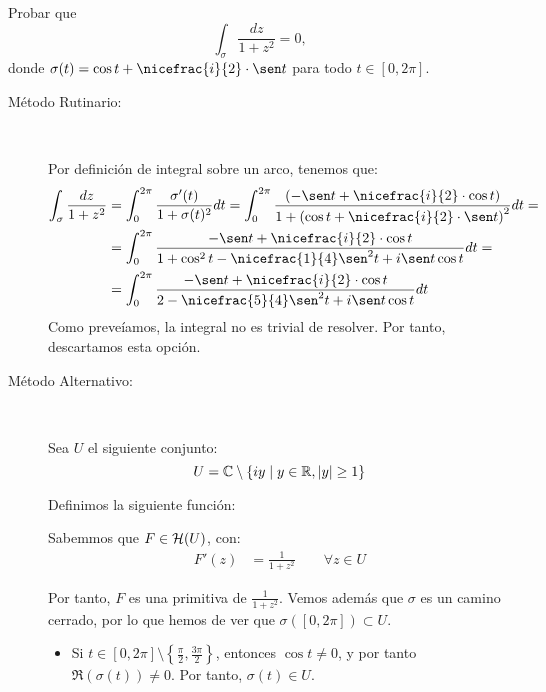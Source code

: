 \begin{ejercicio}
    Probar que
    \[
        \int_{\sigma} \frac{dz}{1+z^2} = 0,
    \]
    donde $\sigma(t) = \cos t + \nicefrac{i}{2}\cdot \sen t$ para todo $t \in [0,2\pi]$.
    \begin{description}
        \item[Método Rutinario:]~
        
        Por definición de integral sobre un arco, tenemos que:
        \begin{align*}
            \int_{\sigma} \frac{dz}{1+z^2} &= \int_{0}^{2\pi} \frac{\sigma'(t)}{1+\sigma(t)^2}dt
            = \int_{0}^{2\pi} \frac{\left(-\sen t + \nicefrac{i}{2}\cdot \cos t\right)}{1+\left(\cos t + \nicefrac{i}{2}\cdot \sen t\right)^2}dt
            =\\&= \int_{0}^{2\pi} \frac{-\sen t + \nicefrac{i}{2}\cdot \cos t}{1+\cos^2t -\nicefrac{1}{4}\sen^2t+i\sen t\cos t}dt
            =\\&= \int_{0}^{2\pi} \frac{-\sen t + \nicefrac{i}{2}\cdot \cos t}{2-\nicefrac{5}{4}\sen^2t+i\sen t\cos t}dt
        \end{align*}
        Como preveíamos, la integral no es trivial de resolver. Por tanto, descartamos esta opción.

        \item[Método Alternativo:]~
        
        Sea $U$ el siguiente conjunto:
        \begin{equation*}
            U=\mathbb{C}\setminus \{iy\mid y \in \mathbb{R},|y|\geq 1\}
        \end{equation*}

        Definimos la siguiente función:

        Sabemmos que $F\in \mathcal{H}(U)$, con:
        \begin{align*}
            F'(z) &= \frac{1}{1+z^2}\qquad \forall z \in U
        \end{align*}

        Por tanto, $F$ es una primitiva de $\frac{1}{1+z^2}$. Vemos además que $\sigma$ es un camino cerrado, por lo que hemos de ver que $\sigma\left([0,2\pi]\right) \subset U$.
        \begin{itemize}
            \item Si $t \in [0,2\pi]\setminus \left\{\frac{\pi}{2},\frac{3\pi}{2}\right\}$, entonces $\cos t\neq 0$, y por tanto $\Re(\sigma(t))\neq 0$. Por tanto, $\sigma(t) \in U$.
            

\end{itemize}
\end{description}
\end{ejercicio}
